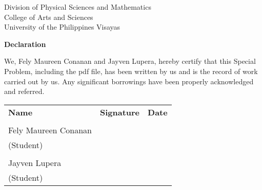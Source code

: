 \begin{center}
	Division of Physical Sciences and Mathematics\\
	College of Arts and Sciences\\
	University of the Philippines Visayas 
	
		\textbf{Declaration}
		\end{center}

We,  Fely Maureen Conanan and Jayven Lupera, hereby certify that this Special Problem, including the pdf file, has been written by us  and is the record of work carried out by us. Any significant borrowings have been properly acknowledged and referred.

	\begin{tabular}{lll}
	\bfseries Name  & \bfseries Signature & \bfseries Date\\ \\
	Fely Maureen Conanan &\signaturerule  & \signaturerule\\ 
	(Student)\\ \\
	Jayven Lupera &\signaturerule &\signaturerule\\
	(Student)\\ 
\end{tabular}



